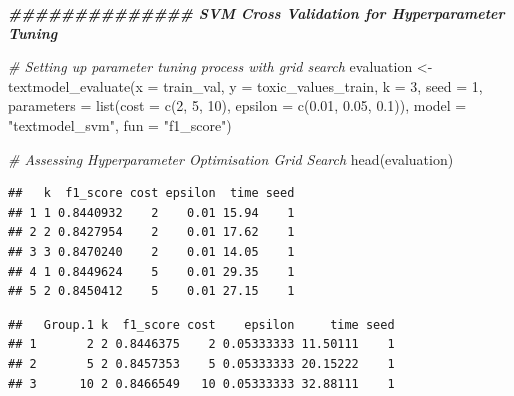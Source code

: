 \documentclass[
]{article}
\newenvironment{Shaded}{\begin{snugshade}}{\end{snugshade}}
\newcommand{\AttributeTok}[1]{\textcolor[rgb]{0.77,0.63,0.00}{#1}}
\newcommand{\CommentTok}[1]{\textcolor[rgb]{0.56,0.35,0.01}{\textit{#1}}}
\newcommand{\DecValTok}[1]{\textcolor[rgb]{0.00,0.00,0.81}{#1}}
\newcommand{\DocumentationTok}[1]{\textcolor[rgb]{0.56,0.35,0.01}{\textbf{\textit{#1}}}}
\newcommand{\FloatTok}[1]{\textcolor[rgb]{0.00,0.00,0.81}{#1}}
\newcommand{\FunctionTok}[1]{\textcolor[rgb]{0.00,0.00,0.00}{#1}}
\newcommand{\NormalTok}[1]{#1}
\newcommand{\OtherTok}[1]{\textcolor[rgb]{0.56,0.35,0.01}{#1}}
\newcommand{\SpecialCharTok}[1]{\textcolor[rgb]{0.00,0.00,0.00}{#1}}
\newcommand{\StringTok}[1]{\textcolor[rgb]{0.31,0.60,0.02}{#1}}
\begin{document}
\begin{Shaded}
\begin{Highlighting}[]
\DocumentationTok{\#\#\#\#\#\#\#\#\#\#\#\#\#\# SVM Cross Validation for Hyperparameter Tuning}

\CommentTok{\# Setting up parameter tuning process with grid search}
\NormalTok{evaluation }\OtherTok{\textless{}{-}} \FunctionTok{textmodel\_evaluate}\NormalTok{(}\AttributeTok{x =}\NormalTok{ train\_val, }\AttributeTok{y =}\NormalTok{ toxic\_values\_train,}
                                 \AttributeTok{k =} \DecValTok{3}\NormalTok{, }\AttributeTok{seed =} \DecValTok{1}\NormalTok{, }
                                 \AttributeTok{parameters =} \FunctionTok{list}\NormalTok{(}\AttributeTok{cost =} \FunctionTok{c}\NormalTok{(}\DecValTok{2}\NormalTok{, }\DecValTok{5}\NormalTok{, }\DecValTok{10}\NormalTok{), }\AttributeTok{epsilon =} \FunctionTok{c}\NormalTok{(}\FloatTok{0.01}\NormalTok{, }\FloatTok{0.05}\NormalTok{, }\FloatTok{0.1}\NormalTok{)),}
                                 \AttributeTok{model =} \StringTok{"textmodel\_svm"}\NormalTok{, }\AttributeTok{fun =} \StringTok{"f1\_score"}\NormalTok{)}

\CommentTok{\# Assessing Hyperparameter Optimisation Grid Search }
\FunctionTok{head}\NormalTok{(evaluation)}
\end{Highlighting}
\end{Shaded}

\begin{verbatim}
##   k  f1_score cost epsilon  time seed
## 1 1 0.8440932    2    0.01 15.94    1
## 2 2 0.8427954    2    0.01 17.62    1
## 3 3 0.8470240    2    0.01 14.05    1
## 4 1 0.8449624    5    0.01 29.35    1
## 5 2 0.8450412    5    0.01 27.15    1
\end{verbatim}

\begin{Shaded}
\end{Shaded}

\begin{verbatim}
##   Group.1 k  f1_score cost    epsilon     time seed
## 1       2 2 0.8446375    2 0.05333333 11.50111    1
## 2       5 2 0.8457353    5 0.05333333 20.15222    1
## 3      10 2 0.8466549   10 0.05333333 32.88111    1
\end{verbatim}
\end{document}
